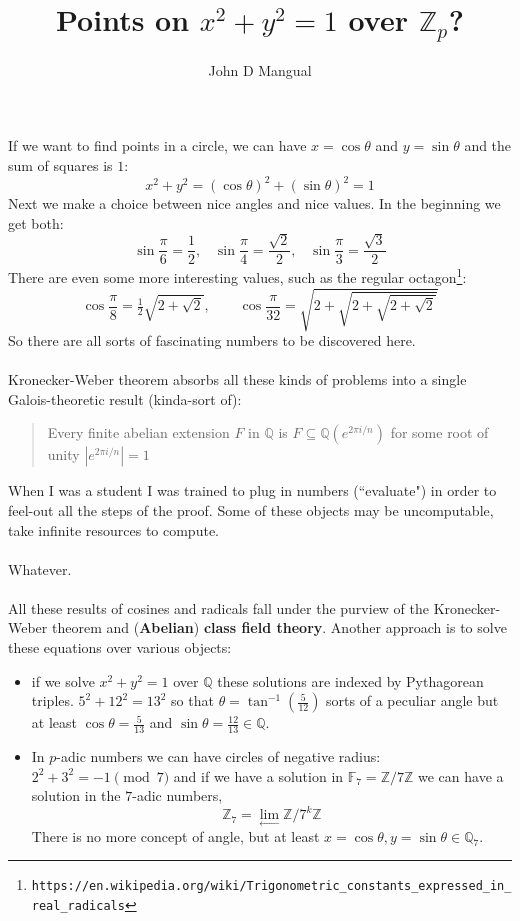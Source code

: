 \documentclass[12pt]{article}
\title{Points on $x^2 + y^2 = 1$ over $\mathbb{Z}_p$?}
\author{John D Mangual}
\date{}
\begin{document}
\selectfont \fontsize{12.5}{15}\selectfont

\maketitle

\noindent If we want to find points in a circle, we can have $x = \cos \theta$ and $y = \sin \theta$ and the sum of squares is $1$:
$$ x^2 + y^2 = (\cos \theta)^2 + (\sin \theta)^2 = 1 $$
Next we make a choice between nice angles and nice values.  In the beginning we get both:
$$ \sin \frac{\pi}{6} = \frac{1}{2},\;\;\; \sin \frac{\pi}{4} = \frac{\sqrt{2}}{2},\;\;\; \sin \frac{\pi}{3} = \frac{\sqrt{3}}{2} $$ 
There are even some more interesting values, such as the regular octagon\footnote{\texttt{https://en.wikipedia.org/wiki/Trigonometric\_constants\_expressed\_in\_real\_radicals}}:
$$ \cos \frac{\pi}{8} = \tfrac{1}{2} \sqrt{2 + \sqrt{2}} ,\quad\quad \cos \frac{\pi}{32} 
= \sqrt{2 + \sqrt{2 + \sqrt{2 + \sqrt{2}}}}$$
So there are all sorts of fascinating numbers to be discovered here.  \\ \\
Kronecker-Weber theorem absorbs all these kinds of problems into a single Galois-theoretic result (kinda-sort of):
\begin{quotation}\noindent
Every finite abelian extension $F$ in $\mathbb{Q}$ is $F \subseteq \mathbb{Q}(e^{2\pi i /n})$  for some root of unity $|e^{2\pi i/n}|=1$
\end{quotation}
When I was a student I was trained to plug in numbers (``evaluate") in order to feel-out all the steps of the proof.  Some of these objects may be uncomputable, take infinite resources to compute.  \\ \\
Whatever. \\ \\
All these results of cosines and radicals fall under the purview of the Kronecker-Weber theorem and (\textbf{Abelian}) \textbf{class field theory}.  Another approach is to solve these equations over various objects:
\begin{itemize}
\item if we solve $x^2 + y^2 = 1$ over $\mathbb{Q}$ these solutions are indexed by Pythagorean triples.   $5^2 + 12^2 = 13^2$ so that $\theta = \tan^{-1} (\frac{5}{12})$ sorts of a peculiar angle but at least $\cos \theta = \frac{5}{13}$ and $\sin \theta = \frac{12}{13} \in \mathbb{Q}$. 
\item In $p$-adic numbers we can have circles of negative radius: $ 2^2 + 3^2 = -1 \pmod 7$ and if we have a solution in $\mathbb{F}_7 = \mathbb{Z}/7\mathbb{Z}$ we can have a solution in the $7$-adic numbers, $$ \mathbb{Z}_7 = \lim_{\longleftarrow} \mathbb{Z}/7^k \mathbb{Z} $$
There is no more concept of angle, but at least $x = \cos \theta, y = \sin \theta \in \mathbb{Q}_7$.

\end{itemize}
\end{document}
